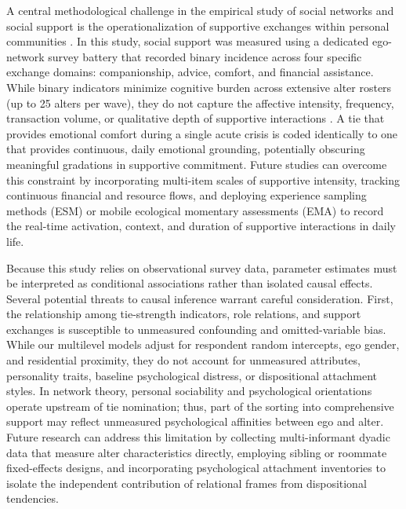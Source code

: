 \documentclass[12pt]{article}
\begin{document}
A central methodological challenge in the empirical study of social networks and social support is the operationalization of supportive exchanges within personal communities \citep{wellman1990different}. In this study, social support was measured using a dedicated ego-network survey battery that recorded binary incidence across four specific exchange domains: companionship, advice, comfort, and financial assistance. While binary indicators minimize cognitive burden across extensive alter rosters (up to 25 alters per wave), they do not capture the affective intensity, frequency, transaction volume, or qualitative depth of supportive interactions \citep{small2017someone}. A tie that provides emotional comfort during a single acute crisis is coded identically to one that provides continuous, daily emotional grounding, potentially obscuring meaningful gradations in supportive commitment. Future studies can overcome this constraint by incorporating multi-item scales of supportive intensity, tracking continuous financial and resource flows, and deploying experience sampling methods (ESM) or mobile ecological momentary assessments (EMA) to record the real-time activation, context, and duration of supportive interactions in daily life.

Because this study relies on observational survey data, parameter estimates must be interpreted as conditional associations rather than isolated causal effects. Several potential threats to causal inference warrant careful consideration. First, the relationship among tie-strength indicators, role relations, and support exchanges is susceptible to unmeasured confounding and omitted-variable bias. While our multilevel models adjust for respondent random intercepts, ego gender, and residential proximity, they do not account for unmeasured attributes, personality traits, baseline psychological distress, or dispositional attachment styles. In network theory, personal sociability and psychological orientations operate upstream of tie nomination; thus, part of the sorting into comprehensive support may reflect unmeasured psychological affinities between ego and alter. Future research can address this limitation by collecting multi-informant dyadic data that measure alter characteristics directly, employing sibling or roommate fixed-effects designs, and incorporating psychological attachment inventories to isolate the independent contribution of relational frames from dispositional tendencies.
\end{document}
